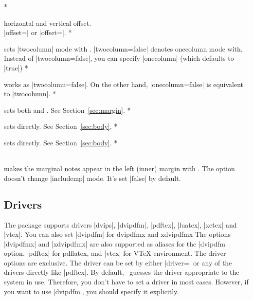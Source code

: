 \begin{Options}
\switchcolumn
\switchcolumn[0]*\item[offset] horizontal and vertical offset.\\
   |offset=| or |offset=|.
\switchcolumn
\switchcolumn[0]*\item[twocolumn] sets |twocolumn| mode with .
  |twocolumn=false| denotes onecolumn mode with.
  Instead of |twocolumn=false|, you can specify |onecolumn| (which
  defaults to |true|)
\switchcolumn
\switchcolumn[0]*\item[onecolumn] works as |twocolumn=false|. On the other hand,
  |onecolumn=false| is equivalent to |twocolumn|. 
\switchcolumn
\switchcolumn[0]*\item[twoside] sets both  and .
  See Section~\ref{sec:margin}.
\switchcolumn
\switchcolumn[0]*\item[textwidth] sets  directly. See Section~\ref{sec:body}.
\switchcolumn
\switchcolumn[0]*\item[textheight] sets  directly. See Section~\ref{sec:body}.
\switchcolumn
\switchcolumn[0]*\item[reversemp\OR reversemarginpar]~\\
  makes the marginal notes appear in the left (inner) margin with
  . The option doesn't change |includemp| mode.
  It's set |false| by default.
\end{Options}

\subsection{Drivers}\label{sec:drivers}

The package supports drivers |dvips|, |dvipdfm|, |pdftex|, |luatex|,
|xetex| and |vtex|. You can also set |dvipdfm| for \textsf{dvipdfmx} and
\textsf{xdvipdfmx} The options |dvipdfmx| and |xdvipdfmx| are also supported
as aliases for the |dvipdfm| option.
|pdftex| for \textsf{pdflatex}, and |vtex| for
V\TeX{} environment.
The driver options are exclusive. The driver can be set by either
|driver=| or any of the drivers directly like |pdftex|.
By default, \Gm\ guesses the driver appropriate to the system
in use. Therefore, you don't have to set a driver in most cases.
However, if you want to use |dvipdfm|, you should specify it explicitly.

